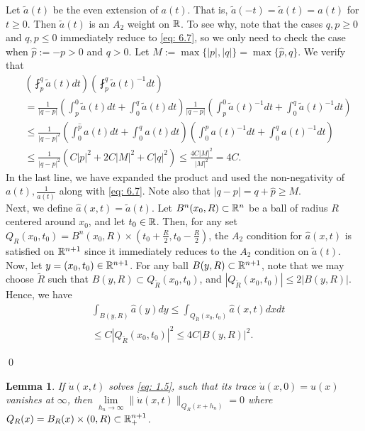 \documentclass{article}
\newtheorem{lemma}[theorem]{Lemma}
\begin{document}
Let $\tilde{a}(t)$ be the even extension of $a(t)$. That is, $\tilde{a}(-t)=\tilde{a}(t)=a(t)$ for $t \ge 0$. Then $\tilde{a}(t)$ is an $A_2$ weight on $\mathbb{R}$. To see why, note that the cases $q,p \ge 0$ and $q,p \le 0$  immediately reduce to \eqref{eq: 6.7}, so we only need to check the case when $\hat{p}:=-p>0$ and $q>0$. Let $M := \max \{|p|,|q|\} = \max \{\hat{p},q\} $. We verify that
\begin{align*}
     & \left(\fint_p^q \tilde{a}(t) dt\right) \left(\fint_p^q \tilde{a}(t)^{-1} dt\right)\\
     &= \frac{1}{|q-p|}\left( \int_p^0 \tilde{a}(t)dt + \int_0^q \tilde{a}(t)dt\right )\frac{1}{|q-p|}\left( \int_p^0 \tilde{a}(t)^{-1}dt + \int_0^q \tilde{a}(t)^{-1}dt\right)\\
     & \le \frac{1}{|q-p|^2} \left(\int_0^{\hat{p}} a(t)dt + \int_0^q a(t)dt \right)\left(\int_0^{\hat{p}} a(t)^{-1}dt + \int_0^q a(t)^{-1}dt \right)\\
     & \le \frac{1}{|q-p|^2} \left(C|p|^2+ 2C|M|^2 + C|q|^2 \right) \le \frac{4C|M|^2}{|M|^2}=4C.
\end{align*}
In the last line, we have expanded the product and used the non-negativity of $a(t), \frac{1}{a(t)}$ along with \eqref{eq: 6.7}. Note also that $|q-p| = q+\hat{p} \ge M$.\\

Next, we define $\hat{a}(x,t) = \tilde{a}(t)$. Let $B^n(x_0, R) \subset \mathbb{R}^n$ be a ball of radius $R$ centered around $x_0$, and let $t_0 \in \mathbb{R}$. Then, for any set $Q_R(x_0, t_0)= B^n(x_0,R) \times (t_0+\frac{R}{2},t_0-\frac{R}{2})$, the $A_2$ condition for $\hat{a}(x,t)$ is satisfied on $\mathbb{R}^{n+1}$ since it immediately reduces to the $A_2$ condition on $\tilde{a}(t)$. Now, let $y=(x_0,t_0) \in \mathbb{R}^{n+1}$. For any ball $B(y,R) \subset \mathbb{R}^{n+1}$, note that we may choose $\tilde{R}$ such that $B(y,R) \subset Q_{\tilde{R}}(x_0, t_0)$, and $| Q_{\tilde{R}}(x_0, t_0)| \le 2 |B(y,R)|$. Hence, we have
\begin{align*}
    & \int_{B(y,R)}\hat{a}(y)dy \le \int_{Q_{\tilde{R}}(x_0, t_0)}\hat{a}(x,t)dxdt \\
    & \le C | Q_{\tilde{R}}(x_0, t_0)|^2 \le 4C |B(y,R)|^2.
\end{align*}

\qed


 \begin{lemma}
 \label{lm 6.3}
If $\dot{u}(x,t)$ solves \eqref{eq: 1.5}, such that its trace $\dot{u}(x,0)=u(x)$ vanishes at $\infty$, then $\lim\limits_{h_n \to \infty}\|\dot{u}(x,t)\|_{Q_R(x+h_n)}=0$ where $Q_R(x) = B_R(x) \times (0,R) \subset \mathbb{R}^{n+1}_+$.
\end{lemma}
\end{document}
